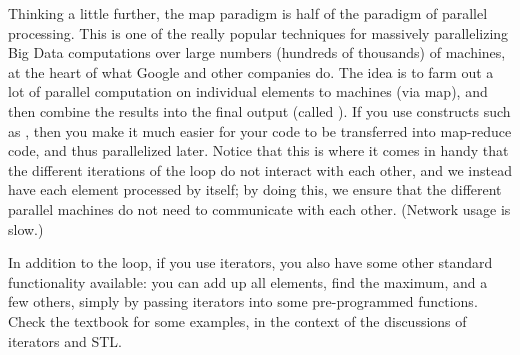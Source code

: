 Thinking a little further, the map paradigm is half of the
 paradigm of parallel processing. This is one of the
really popular techniques for massively parallelizing Big Data
computations over large numbers (hundreds of thousands) of machines,
at the heart of what Google and other companies do.
The idea is to farm out a lot of parallel computation on individual
elements to machines (via map), and then combine the results into the
final output (called ).
If you use constructs such as , then you make it much
easier for your code to be transferred into map-reduce code, and
thus parallelized later. 
Notice that this is where it comes in handy that the different
iterations of the loop do not interact with each other, and we instead
have each element processed by itself; by doing this, we ensure that
the different parallel machines do not need to communicate with each
other. (Network usage is slow.)

In addition to the  loop, if you use iterators, you
also have some other standard functionality available: you can add up
all elements, find the maximum, and a few others, simply by passing
iterators into some pre-programmed functions. Check the textbook for
some examples, in the context of the discussions of iterators and STL.
